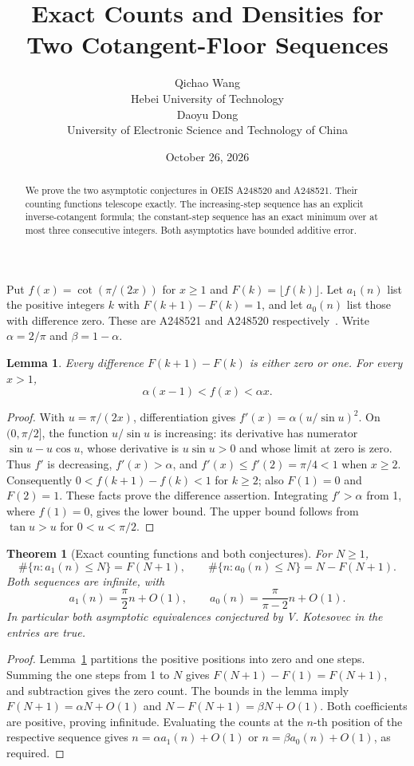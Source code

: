 \documentclass[10pt]{article}
\title{Exact Counts and Densities for Two Cotangent-Floor Sequences}
\author{Qichao Wang\\{\small Hebei University of Technology}\\[0.3em]
Daoyu Dong\\{\small University of Electronic Science and Technology of China}}
\date{October 26, 2026}
\newtheorem{theorem}{Theorem}
\newtheorem{lemma}{Lemma}
\begin{document}
\maketitle
\begin{abstract}
We prove the two asymptotic conjectures in OEIS A248520 and A248521.
Their counting functions telescope exactly. The increasing-step sequence has
an explicit inverse-cotangent formula; the constant-step sequence has an exact
minimum over at most three consecutive integers. Both asymptotics have bounded
additive error.
\end{abstract}

Put $f(x)=\cot(\pi/(2x))$ for $x\ge1$ and $F(k)=\lfloor f(k)\rfloor$.
Let $a_1(n)$ list the positive integers $k$ with $F(k+1)-F(k)=1$,
and let $a_0(n)$ list those with difference zero. These are A248521 and
A248520 respectively~\cite{one,zero}. Write $\alpha=2/\pi$ and
$\beta=1-\alpha$.

\begin{lemma}\label{lem:step}
Every difference $F(k+1)-F(k)$ is either zero or one. For every $x>1$,
\[
 \alpha(x-1)<f(x)<\alpha x.
\]
\end{lemma}
\begin{proof}
With $u=\pi/(2x)$, differentiation gives
$f'(x)=\alpha(u/\sin u)^2$. On $(0,\pi/2]$, the function
$u/\sin u$ is increasing: its derivative has numerator
$\sin u-u\cos u$, whose derivative is $u\sin u>0$ and whose limit at zero
is zero. Thus $f'$ is decreasing, $f'(x)>\alpha$, and
$f'(x)\le f'(2)=\pi/4<1$ when $x\ge2$.
Consequently $0<f(k+1)-f(k)<1$ for $k\ge2$; also $F(1)=0$ and $F(2)=1$.
These facts prove the difference assertion. Integrating $f'>\alpha$ from
1, where $f(1)=0$, gives the lower bound. The upper bound follows from
$\tan u>u$ for $0<u<\pi/2$.
\end{proof}

\begin{theorem}[Exact counting functions and both conjectures]\label{thm:density}
For $N\ge1$,
\[
 \#\{n:a_1(n)\le N\}=F(N+1),\qquad
 \#\{n:a_0(n)\le N\}=N-F(N+1).
\]
Both sequences are infinite, with
\[
 a_1(n)=\frac\pi2 n+O(1),\qquad
 a_0(n)=\frac\pi{\pi-2}n+O(1).
\]
In particular both asymptotic equivalences conjectured by V. Kotesovec in
the entries are true.
\end{theorem}
\begin{proof}
Lemma~\ref{lem:step} partitions the positive positions into zero and one
steps. Summing the one steps from 1 to $N$ gives $F(N+1)-F(1)=F(N+1)$,
and subtraction gives the zero count. The bounds in the lemma imply
$F(N+1)=\alpha N+O(1)$ and $N-F(N+1)=\beta N+O(1)$.
Both coefficients are positive, proving infinitude. Evaluating the counts
at the $n$-th position of the respective sequence gives
$n=\alpha a_1(n)+O(1)$ or $n=\beta a_0(n)+O(1)$, as required.
\end{proof}
\end{document}
